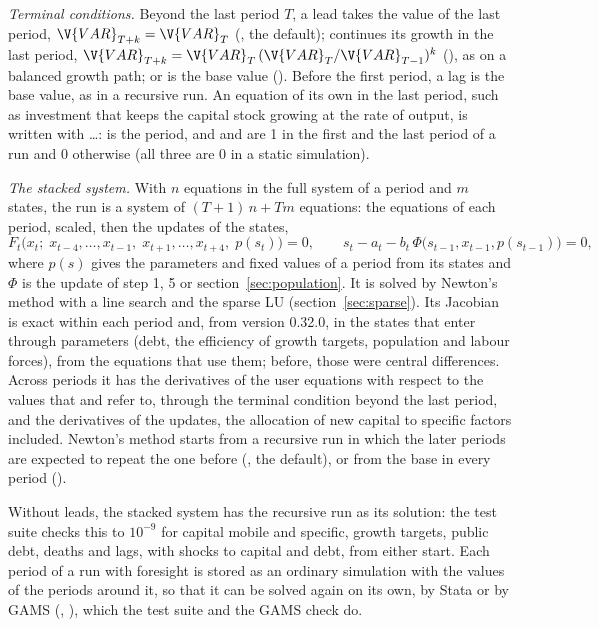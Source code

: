 \textit{Terminal conditions.} Beyond the last period $T$, a lead takes the value
of the last period, $\V{VAR}_{T+k} = \V{VAR}_T$ (, the
default); continues its growth in the last period,
$\V{VAR}_{T+k} = \V{VAR}_T\,(\V{VAR}_T/\V{VAR}_{T-1})^k$
(), as on a balanced growth path; or is the base value
(). Before the first period, a lag is the base value, as in
a recursive run. An equation of its own in the last period, such as investment
that keeps the capital stock growing at the rate of output, is written with
 \ldots\cmd{)}:  is the period, and  and
 are 1 in the first and the last period of a run and 0 otherwise
(all three are 0 in a static simulation).

\textit{The stacked system.} With $n$ equations in the full system of a period
and $m$ states, the run is a system of $(T + 1)\,n + T m$ equations: the
equations of each period, scaled, then the updates of the states,
\begin{equation*}
F_t\bigl(x_t;\; x_{t-4}, \dots, x_{t-1},\; x_{t+1}, \dots, x_{t+4},\; p(s_t)\bigr) = 0,
\qquad
s_t - a_t - b_t \,\Phi\bigl(s_{t-1}, x_{t-1}, p(s_{t-1})\bigr) = 0,
\end{equation*}
where $p(s)$ gives the parameters and fixed values of a period from its states
and $\Phi$ is the update of step 1, 5 or section~\ref{sec:population}. It is
solved by Newton's method with a line search and the sparse LU
(section~\ref{sec:sparse}). Its Jacobian is exact within each period and, from
version 0.32.0, in the states that enter through parameters (debt, the
efficiency of growth targets, population and labour forces), from the
equations that use them; before, those were central differences. Across periods
it has the derivatives of the user equations with respect to the values that
 and  refer to, through the terminal condition beyond
the last period, and the derivatives of the updates, the allocation of new
capital to specific factors included. Newton's method starts from a recursive
run in which the later periods are expected to repeat the one before
(, the default), or from the base in every period
().

Without leads, the stacked system has the recursive run as its solution: the
test suite checks this to $10^{-9}$ for capital mobile and specific, growth
targets, public debt, deaths and lags, with shocks to capital and debt, from
either start. Each period of a run with foresight is stored as an ordinary
simulation with the values of the periods around it, so that it can be
solved again on its own, by Stata or by GAMS (,
), which the test suite and the GAMS check do.
